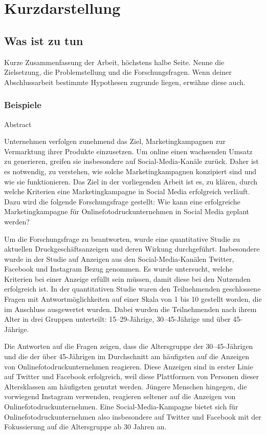 

\section*{Kurzdarstellung}
\label{sec:kurzdarstellung}

\subsection{Was ist zu tun}
Kurze Zusammenfassung der Arbeit, höchstens halbe Seite.
Nenne die Zielsetzung, die Problemstellung und die Forschungsfragen. Wenn deiner Abschlussarbeit bestimmte Hypothesen zugrunde liegen, erwähne diese auch.

\subsubsection*{Beispiele}
Abstract

Unternehmen verfolgen zunehmend das Ziel, Marketingkampagnen zur Vermarktung ihrer Produkte einzusetzen. 
Um online einen wachsenden Umsatz zu generieren, greifen sie insbesondere auf Social-Media-Kanäle zurück. 
Daher ist es notwendig, zu verstehen, wie solche Marketingkampagnen konzipiert sind und wie sie funktionieren.
Das Ziel in der vorliegenden Arbeit ist es, zu klären, durch welche Kriterien eine Marketingkampagne in Social Media erfolgreich verläuft. Dazu wird die folgende Forschungsfrage gestellt: Wie kann eine erfolgreiche Marketingkampagne für Onlinefotodruckunternehmen in Social Media geplant werden?

Um die Forschungsfrage zu beantworten, wurde eine quantitative Studie zu aktuellen Druckgeschäftsanzeigen und deren Wirkung durchgeführt. Insbesondere wurde in der Studie auf Anzeigen aus den Social-Media-Kanälen Twitter, Facebook und Instagram Bezug genommen. Es wurde untersucht, welche Kriterien bei einer Anzeige erfüllt sein müssen, damit diese bei den Nutzenden erfolgreich ist. In der quantitativen Studie waren den Teilnehmenden geschlossene Fragen mit Antwortmöglichkeiten auf einer Skala von 1 bis 10 gestellt worden, die im Anschluss ausgewertet wurden. Dabei wurden die Teilnehmenden nach ihrem Alter in drei Gruppen unterteilt: 15–29-Jährige, 30–45-Jährige und über 45-Jährige.

Die Antworten auf die Fragen zeigen, dass die Altersgruppe der 30–45-Jährigen und die der über 45-Jährigen im Durchschnitt am häufigsten auf die Anzeigen von Onlinefotodruckunternehmen reagieren. Diese Anzeigen sind in erster Linie auf Twitter und Facebook erfolgreich, weil diese Plattformen von Personen dieser Altersklassen am häufigsten genutzt werden. Jüngere Menschen hingegen, die vorwiegend Instagram verwenden, reagieren seltener auf die Anzeigen von Onlinefotodruckunternehmen. Eine Social-Media-Kampagne bietet sich für Onlinefotodruckunternehmen also insbesondere auf Twitter und Facebook mit der Fokussierung auf die Altersgruppe ab 30 Jahren an.

